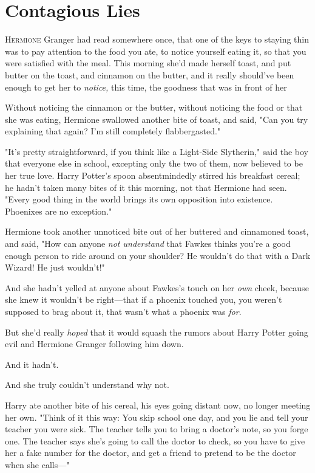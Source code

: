 \chapter{Contagious Lies}

\lettrine{H}{ermione} Granger
had read somewhere once, that one of the keys to staying thin was to pay
attention to the food you ate, to notice yourself eating it, so that you were
satisfied with the meal. This morning she'd made herself toast, and put butter
on the toast, and cinnamon on the butter, and it really should've been enough
to get her to \emph{notice,} this time, the goodness that was in front of
her{\el}

Without noticing the cinnamon or the butter, without noticing the food or that
she was eating, Hermione swallowed another bite of toast, and said, "Can you
try explaining that again? I'm still completely flabbergasted."

"It's pretty straightforward, if you think like a Light-Side Slytherin," said
the boy that everyone else in school, excepting only the two of them, now
believed to be her true love. Harry Potter's spoon absentmindedly stirred his
breakfast cereal; he hadn't taken many bites of it this morning, not that
Hermione had seen. "Every good thing in the world brings its own opposition
into existence. Phoenixes are no exception."

Hermione took another unnoticed bite out of her buttered and cinnamoned toast,
and said, "How can anyone \emph{not understand} that Fawkes thinks you're a
good enough person to ride around on your shoulder? He wouldn't do that with a
Dark Wizard! He just wouldn't!"

And she hadn't yelled at anyone about Fawkes's touch on her \emph{own} cheek,
because she knew it wouldn't be right---that if a phoenix touched you, you
weren't supposed to brag about it, that wasn't what a phoenix was \emph{for}.

But she'd really \emph{hoped} that it would squash the rumors about Harry
Potter going evil and Hermione Granger following him down.

And it hadn't.

And she truly couldn't understand why not.

Harry ate another bite of his cereal, his eyes going distant now, no longer
meeting her own. "Think of it this way: You skip school one day, and you lie
and tell your teacher you were sick. The teacher tells you to bring a doctor's
note, so you forge one. The teacher says she's going to call the doctor to
check, so you have to give her a fake number for the doctor, and get a friend
to pretend to be the doctor when she calls\mbox{---}"

